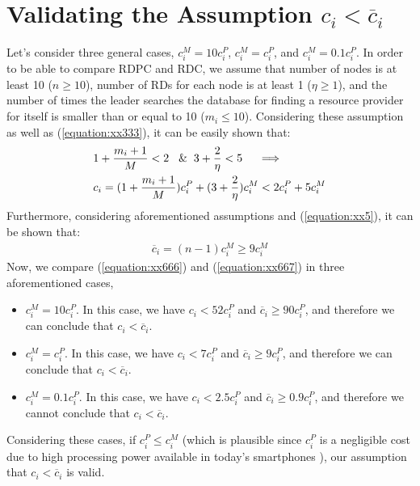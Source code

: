 \documentclass[journal,12pt, onecolumn]{IEEEtran}
\begin{document}
\section{Validating the Assumption $c_i < \overline{c}_i$}
\label{validating}
Let's consider three general cases, $c_i ^{M} = 10c_i ^{P}$, $c_i ^{M} = c_i ^{P}$, and $c_i ^{M} = 0.1c_i ^{P}$. In order to be able to compare RDPC and RDC, we assume that number of nodes is at least 10 ($n\geq 10$), number of RDs for each node is at least 1 ($\eta \geq 1$), and the number of times the leader searches the database for finding a resource provider for itself is smaller than or equal to 10 ($m_i \leq 10$). Considering these assumption as well as (\ref{equation:xx333}), it can be easily shown that:
\begin{align}
\label{equation:xx666}
&1 + \dfrac{m_i +1}{M}< 2  \hspace{3mm} \&  \hspace{2mm} 3+\dfrac{2}{\eta} < 5 \hspace{5mm} \Longrightarrow \nonumber \\
&c_i = (1 + \dfrac{m_i +1}{M})c_i ^{P} + (3+\dfrac{2}{\eta})c_i ^{M}  < 2c_i ^{P} + 5c_i ^{M}
\end{align} 
Furthermore, considering aforementioned assumptions and (\ref{equation:xx5}), it can be shown that:
\begin{align}
\label{equation:xx667}
 \overline{c}_i = (n-1)c_i^M \geq 9c_i ^{M}
\end{align} 
Now, we compare (\ref{equation:xx666}) and (\ref{equation:xx667}) in three aforementioned cases,
\begin{itemize}
\item $c_i ^{M} = 10c_i ^{P}$. In this case, we have $c_i < 52c_i ^{P}$ and  $\overline{c}_i \geq 90 c_i ^{P}$, and therefore we can conclude that $c_i < \overline{c}_i$. 
\item $c_i ^{M} = c_i ^{P}$. In this case, we have $c_i < 7c_i ^{P}$ and  $\overline{c}_i \geq 9 c_i ^{P}$, and therefore we can conclude that $c_i < \overline{c}_i$.
\item $c_i ^{M} = 0.1c_i ^{P}$. In this case, we have $c_i < 2.5c_i ^{P}$ and  $\overline{c}_i \geq 0.9 c_i ^{P}$, and therefore we cannot conclude that $c_i < \overline{c}_i$.
\end{itemize}

Considering these cases, if $c_i ^{P} \leq c_i ^{M}$ (which is plausible since $c_i ^{P}$ is a negligible cost due to high processing power available in today's smartphones \cite{x29}), our assumption that $c_i < \overline{c}_i$ is valid. 
\end{document}
